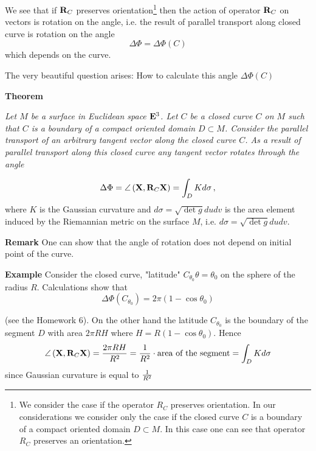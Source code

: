 \documentclass[12pt]{article}
\theoremstyle{theorem}
\numberwithin{equation}{section}
\begin{document}
{We see that if ${\bf R}_C$ preserves orientation\footnote{We consider the case if the operator $R_C$ preserves orientation.
In our considerations we consider only the case if the closed curve $C$ is a boundary of
a compact oriented domain $D\subset M$. In this case one can see that operator $R_C$ preserves an orientation.}
 then the action of operator ${\bf R}_C$ on vectors is rotation on the angle,
i.e. the result of parallel transport along closed curve is rotation on the angle
                               \begin{equation}\label{rotationontheangle}
                               \Delta\Phi=\Delta\Phi(C)
                               \end{equation}
 which depends on the curve.


The very beautiful question arises:  How to calculate this angle $\Delta\Phi(C)$


\m

{\bf Theorem}
{\it  Let $M$ be a surface in  Euclidean space ${\bf E}^3$.
  Let $C$ be a closed curve $C$ on $M$ such that $C$ is a boundary of a compact oriented domain $D\subset M$.
Consider the parallel transport of an arbitrary tangent vector along the closed curve $C$.
As a result of parallel transport along this closed curve any  tangent vector rotates through the angle

\begin{equation}\label{theoremofrotationonangle}
\Delta\Phi=\angle\left({{\bf X}, {\bf R}_C{\bf X}}\right)=\int_D K d\sigma\,,
             \end{equation}
where $K$ is the Gaussian curvature and $d\sigma=\sqrt {\det g}dudv$ is the area element induced by the
Riemannian metric on the surface $M$, i.e.  $d\sigma=\sqrt {\det g}dudv$.



}

\m
{\bf Remark} One can show that the angle of rotation does not depend on initial point of the curve.


\m


{\bf Example} Consider the closed curve, "latitude" $C_{\theta_0}\theta=\theta_0$ on the sphere of the radius $R$.
Calculations show that
               \begin{equation}\label{rotationforlatitude}
                \Delta\Phi(C_{\theta_0})=2\pi(1-\cos\theta_0)
               \end{equation}

(see the Homework 6). On the other hand the latitude $C_{\theta_0}$ is the boundary of the segment  $D$
 with area $2\pi RH$ where $H=R(1-\cos \theta_0)$. Hence
           $$
   \angle\left({{\bf X}, {\bf R}_C{\bf X}}\right)={2\pi RH\over R^2}={1\over R^2}\cdot \hbox{area of the segment}=\int_D  Kd\sigma
           $$
since Gaussian curvature is equal to $1\over R^2$

}
\end{document}
